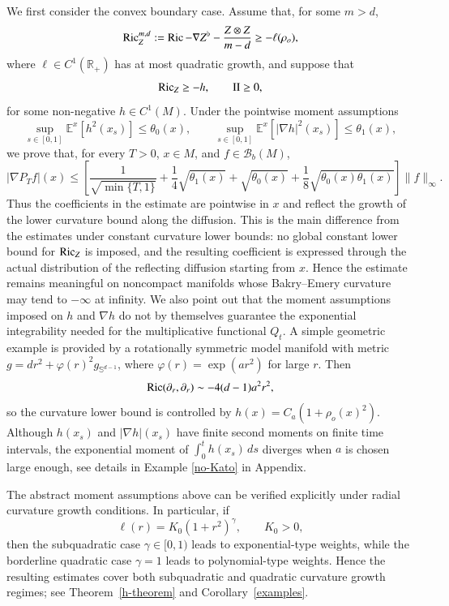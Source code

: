 \documentclass[11pt,twoside, reqno]{article}
\def\mathpal#1{\mathop{\mathchoice{\text{\rm #1}}%
   {\text{\rm #1}}{\text{\rm #1}}%
   {\text{\rm #1}}}\nolimits}
\newcommand\Ric{\mathpal{Ric}}
\newcommand\1{\mathbbm{1}}
\newcommand\II{\mathrm{II}}
\theoremstyle{definition}
\numberwithin{equation}{section}
\begin{document}
We first consider the convex boundary case. Assume that, for some \(m>d\),
\[
        \Ric_Z^{m,d}
        :=
        \Ric-\nabla Z^\flat-\frac{Z\otimes Z}{m-d}
        \geq
        -\ell(\rho_o),
\]
where \(\ell\in C^1(\mathbb R_+)\) has at most quadratic growth, and suppose
that
\[
        \Ric_Z\geq -h,
        \qquad
        \II\geq0,
\]
for some non-negative \(h\in C^1(M)\). Under the pointwise moment assumptions
\[
        \sup_{s\in[0,1]}\mathbb E^x[h^2(x_s)]\leq \theta_0(x),
        \qquad
        \sup_{s\in[0,1]}\mathbb E^x[|\nabla h|^2(x_s)]
        \leq \theta_1(x),
\]
we prove that, for every \(T>0\), \(x\in M\), and
\(f\in\mathcal B_b(M)\),
\[
        |\nabla P_Tf|(x)
        \leq
        \left[
        \frac1{\sqrt{\min\{T,1\}}}
        +
        \frac14\sqrt{\theta_1(x)}
        +
        \sqrt{\theta_0(x)}
        +
        \frac18\sqrt{\theta_0(x)\theta_1(x)}
        \right]
        \|f\|_\infty .
\]
Thus the coefficients in the estimate are pointwise in \(x\) and reflect the
growth of the lower curvature bound along the diffusion.  This is the main
difference from the estimates under constant curvature lower bounds: no global
constant lower bound for \(\Ric_Z\) is imposed, and the resulting coefficient is
expressed through the actual distribution of the reflecting diffusion starting
from \(x\).  Hence the estimate remains meaningful on noncompact manifolds
whose Bakry--Emery curvature may tend to \(-\infty\) at infinity. We also point out that the moment assumptions imposed on \(h\) and
\(\nabla h\) do not by themselves guarantee the exponential integrability
needed for the multiplicative functional $Q_t$. A simple geometric example is provided by a rotationally symmetric model
manifold with metric \(g=dr^2+\varphi(r)^2g_{\mathbb S^{d-1}}\), where
\(\varphi(r)=\exp(ar^2)\) for large \(r\). Then
\[
        \Ric(\partial_r,\partial_r)
        \sim -4(d-1)a^2r^2,
\]
so the curvature lower bound is controlled by
\(h(x)=C_a(1+\rho_o(x)^2)\). Although \(h(x_s)\) and
\(|\nabla h|(x_s)\) have finite second moments on finite time intervals, the
exponential moment of \(\int_0^t h(x_s)\,ds\) diverges when \(a\) is chosen
large enough, see details in Example \ref{no-Kato} in Appendix.

The abstract moment assumptions above can be verified explicitly under radial
curvature growth conditions. In particular, if
\[
        \ell(r)=K_0(1+r^2)^\gamma,
        \qquad K_0>0,
\]
then the subquadratic case \(\gamma\in[0,1)\) leads to exponential-type
weights, while the borderline quadratic case \(\gamma=1\) leads to
polynomial-type weights. Hence the resulting estimates cover both
subquadratic and quadratic curvature growth regimes; see Theorem~\ref{h-theorem}
and Corollary~\ref{examples}.
\end{document}
